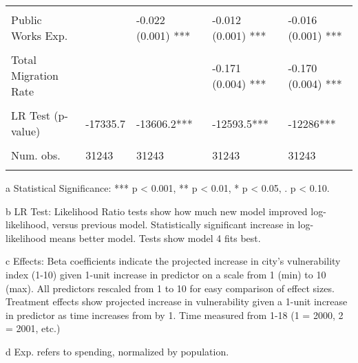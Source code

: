 \documentclass[]{elsarticle} %
\begin{document}
\begin{table}
\begin{threeparttable}
\begin{tabular}[t]{lllll}
\cellcolor{gray!6}{Emergency Services Exp.} & \cellcolor{gray!6}{} & \cellcolor{gray!6}{-0.040 (0.001) ***} & \cellcolor{gray!6}{-0.045 (0.001) ***} & \cellcolor{gray!6}{-0.044 (0.001) ***}\\
Public Works Exp. &  & -0.022 (0.001) *** & -0.012 (0.001) *** & -0.016 (0.001) ***\\
\cellcolor{gray!6}{Disaster Conditions} & \cellcolor{gray!6}{} & \cellcolor{gray!6}{} & \cellcolor{gray!6}{0.042 (0.008) ***} & \cellcolor{gray!6}{0.051 (0.008) ***}\\
\addlinespace
Total Migration Rate &  &  & -0.171 (0.004) *** & -0.170 (0.004) ***\\
\cellcolor{gray!6}{Constant} & \cellcolor{gray!6}{6.223 (0.047) ***} & \cellcolor{gray!6}{7.256 (0.047) ***} & \cellcolor{gray!6}{7.458 (0.046) ***} & \cellcolor{gray!6}{7.572 (0.046) ***}\\
\midrule
LR Test (p-value) & -17335.7 & -13606.2*** & -12593.5*** & -12286***\\
\cellcolor{gray!6}{R2} & \cellcolor{gray!6}{0.141} & \cellcolor{gray!6}{0.323} & \cellcolor{gray!6}{0.366} & \cellcolor{gray!6}{0.378}\\
Num. obs. & 31243 & 31243 & 31243 & 31243\\
\addlinespace
\cellcolor{gray!6}{F statistic} & \cellcolor{gray!6}{212.995} & \cellcolor{gray!6}{532.373} & \cellcolor{gray!6}{599.811} & \cellcolor{gray!6}{499.149}\\
\bottomrule
\end{tabular}
\begin{tablenotes}
\item[a] Statistical Significance: *** p < 0.001, ** p < 0.01, * p < 0.05, . p < 0.10.
\item[b] LR Test: Likelihood Ratio tests show how much new model improved log-likelihood, versus previous model. Statistically significant increase in log-likelihood means better model. Tests show model 4 fits best.
\item[c] Effects: Beta coefficients indicate the projected increase in city's vulnerability index (1-10) given 1-unit increase in predictor on a scale from 1 (min) to 10 (max). All predictors rescaled from 1 to 10 for easy comparison of effect sizes. Treatment effects show projected increase in vulnerability given a 1-unit increase in predictor as time increases from by 1. Time measured from 1-18 (1 = 2000, 2 = 2001, etc.)
\item[d] Exp. refers to spending, normalized by population.
\end{tablenotes}
\end{threeparttable}
\end{table}
\end{document}
